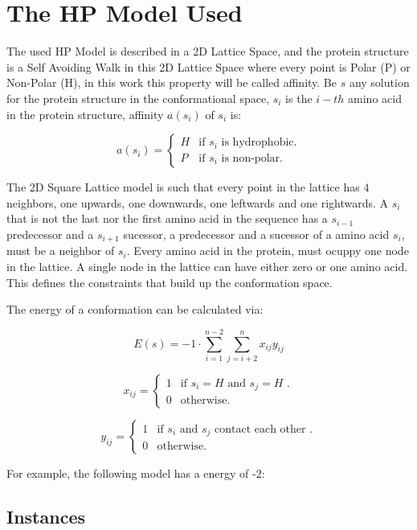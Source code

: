 \documentclass[10pt]{article}
\begin{document}
\section{The HP Model Used}\label{sec:2}

The used HP Model is described in a 2D Lattice Space, and the protein structure is a Self Avoiding Walk in this 2D Lattice Space where every point is Polar (P) or Non-Polar (H), in this work this property will be called affinity. Be $s$ any solution for the protein structure in the conformational space, $s_i$ is the $i-th$ amino acid in the protein structure, affinity $a(s_i)$ of $s_i$ is:

$$
a(s_i) = \begin{cases}
      H & \text{if $s_i$ is hydrophobic.}\\
      P & \text{if $s_i$ is non-polar.}
    \end{cases}
$$

The 2D Square Lattice model is such that every point in the lattice has $4$ neighbors, one upwards, one downwards, one leftwards and one rightwards. A $s_i$ that is not the last nor the first amino acid in the sequence has a $s_{i-1}$ predecessor and a $s_{i+1}$ sucessor, a predecessor and a sucessor of a amino acid $s_i$, must be a neighbor of $s_i$. Every amino acid in the protein, must ocuppy one node in the lattice. A single node in the lattice can have either zero or one amino acid. This defines the constraints that build up the conformation space.

The energy of a conformation can be calculated via:

$$E(s) = -1 \cdot \sum_{i=1}^{n-2} \sum_{j=i+2}^{n} x_{ij} y_{ij} $$

$$
x_{ij} = \begin{cases}
     1 & \text{if $s_i = H$ and $s_j = H$  .}\\
     0 & \text{otherwise.}
    \end{cases}
$$

$$
y_{ij} = \begin{cases}
     1 & \text{if $s_i$ and $s_j$ contact each other .}\\
     0 & \text{otherwise.}
    \end{cases}
$$

For example, the following model has a energy of -2:



\subsection{Instances}
\end{document}
